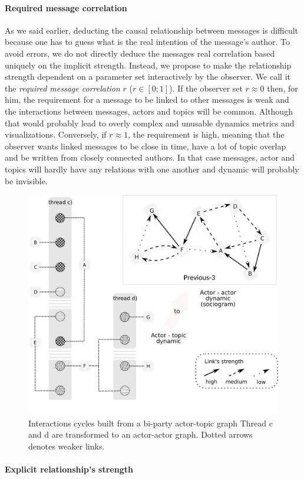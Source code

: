 \documentclass[a4paper,twoside]{article}
\begin{document}
\paragraph{Required message correlation}

As we said earlier, deducting the causal relationship between messages is difficult because one has to guess what is the real intention of the message's author.  To avoid errors, we do not directly deduce the messages real correlation based uniquely on the implicit strength.  Instead, we propose to make the relationship strength dependent on a parameter set interactively by the observer.  We call it the \emph{required message correlation} $r$ ($r \in[0;1]$).  If the observer set $r \approx 0$ then, for him, the requirement for a message to be linked to other messages is weak and the interactions between messages, actors and topics will be common.  Although that would probably lead to overly complex and unusable dynamics metrics and visualizations.  Conversely, if $r\approx 1$, the requirement is high, meaning that the observer wants linked messages to be close in time, have a lot of topic overlap and be written from closely connected authors.  In that case messages, actor and topics will hardly have any relations with one another and dynamic will probably be invisible.

\begin{figure}[t]
 \includegraphics[width=.5\textwidth]{images/cycles.png}
 \small{
  \caption{\label{fig:cycles}
   Interactions cycles built from a bi-party actor-topic graph Thread c and d are transformed to an actor-actor graph.  Dotted arrows denotes weaker links.
  }}
\end{figure}
 

\paragraph{Explicit relationship's strength}
\end{document}
